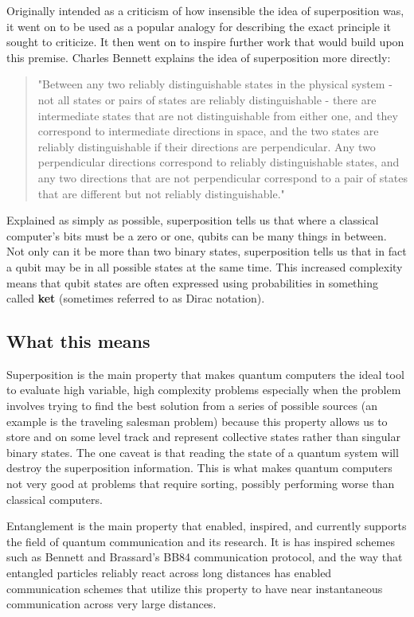     Originally intended as a criticism of how insensible the idea of superposition was, it went on to be used as a popular analogy for describing the exact principle it sought to criticize. It then went on to inspire further work that would build upon this premise. Charles Bennett explains the idea of superposition more directly:
    \begin{quote}
        "Between any two reliably distinguishable states in the physical system - not all states or pairs of states are reliably distinguishable - there are intermediate states that are not distinguishable from either one, and they correspond to intermediate directions in space, and the two states are reliably distinguishable if their directions are perpendicular. Any two perpendicular directions correspond to reliably distinguishable states, and any two directions that are not perpendicular correspond to a pair of states that are different but not reliably distinguishable." \cite{charles_b}
    \end{quote}

    Explained as simply as possible, superposition tells us that where a classical computer's bits must be a zero or one, qubits can be many things in between. Not only can it be more than two binary states, superposition tells us that in fact a qubit may be in all possible states at the same time. This increased complexity means that qubit states are often expressed using probabilities in something called \textbf{\gls{ket}} (sometimes referred to as Dirac notation). 

    \subsection{What this means}
    Superposition is the main property that makes quantum computers the ideal tool to evaluate high variable, high complexity problems especially when the problem involves trying to find the best solution from a series of possible sources (an example is the traveling salesman problem) because this property allows us to store and on some level track and represent collective states rather than singular binary states. The one caveat is that reading the state of a quantum system will destroy the superposition information. This is what makes quantum computers not very good at problems that require sorting, possibly performing worse than classical computers. 

    Entanglement is the main property that enabled, inspired, and currently supports the field of quantum communication and its research. It is has inspired schemes such as Bennett and Brassard's BB84 communication protocol, and the way that entangled particles reliably react across long distances has enabled communication schemes that utilize this property to have near instantaneous communication across very large distances.

